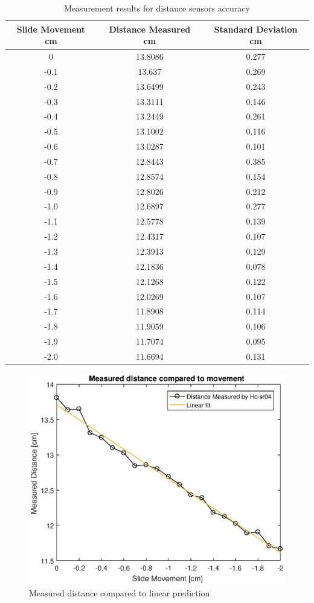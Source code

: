 \documentclass[twoside]{ctuthesis}
\theoremstyle{plain}
\theoremstyle{definition}
\theoremstyle{note}
\begin{document}
\begin{table}[H]
\centering
	\begin{tabular}{| c |c| c |}
		\hline
		Slide Movement cm & Distance Measured cm & Standard Deviation cm\\ \hline
		0 & 13.8086 & 0.277\\
		-0.1 & 13.637 & 0.269\\
		-0.2 & 13.6499 & 0.243\\
		-0.3 & 13.3111 & 0.146\\
		-0.4 & 13.2449 & 0.261\\
		-0.5 & 13.1002 & 0.116\\
		-0.6 & 13.0287 & 0.101\\
		-0.7 & 12.8443 & 0.385\\
		-0.8 & 12.8574 & 0.154\\
		-0.9 & 12.8026 & 0.212\\
		-1.0 & 12.6897 & 0.277\\
		-1.1 & 12.5778 & 0.139\\
		-1.2 & 12.4317 & 0.107\\
		-1.3 & 12.3913 & 0.129\\
		-1.4 & 12.1836 & 0.078\\
		-1.5 & 12.1268 & 0.122\\
		-1.6 & 12.0269 & 0.107\\
		-1.7 & 11.8908 & 0.114\\
		-1.8 & 11.9059 & 0.106\\
		-1.9 & 11.7074 & 0.095\\
		-2.0 & 11.6694 & 0.131\\
		\hline
	\end{tabular}
	\caption{Measurement results for distance sensors accuracy}
\end{table}



\begin{figure}[H]
	\centering
	\includegraphics[width = \textwidth]{DistanceMeasuringGraphAndFit2}
	\caption{Measured distance compared to linear prediction}
\end{figure}
\end{document}
